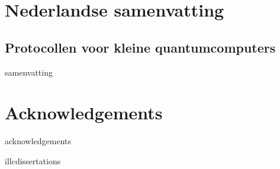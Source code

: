 \documentclass[12pt,twoside]{book}
\theoremstyle{definition}
\begin{document}
\clearpage
\section*{Nederlandse samenvatting}
\subsection*{Protocollen voor kleine quantumcomputers}
{samenvatting}


\clearpage
\section*{Acknowledgements}
{acknowledgements}


\clearpage
{ \small 
{illcdissertations}
}
\end{document}
